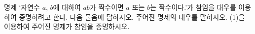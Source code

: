 명제 ‘자연수 $a$, $b$에 대하여 $ab$가 짝수이면 $a$ 또는 $b$는 짝수이다.’가 참임을 대우를 이용하여 증명하려고 한다. 다음 물음에 답하시오.
 주어진 명제의 대우를 말하시오.
 (1)을 이용하여 주어진 명제가 참임을 증명하시오.

